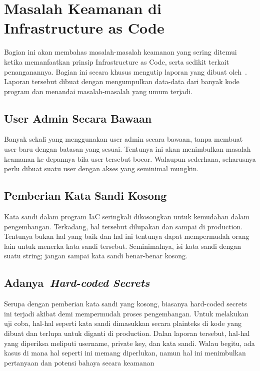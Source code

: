 \section{Masalah Keamanan di Infrastructure as Code}


Bagian ini akan membahas masalah-masalah keamanan yang sering ditemui ketika memanfaatkan prinsip Infrastructure as Code, serta sedikit terkait penanganannya. Bagian ini secara khusus mengutip laporan yang dibuat oleh~\cite{8812041}. Laporan tersebut dibuat dengan mengumpulkan data-data dari banyak kode program dan menandai masalah-masalah yang umum terjadi.

\subsection{User Admin Secara Bawaan}
Banyak sekali yang menggunakan user admin secara bawaan, tanpa membuat user baru dengan batasan yang sesuai. Tentunya ini akan menimbulkan masalah keamanan ke depannya bila user tersebut bocor. Walaupun sederhana, seharusnya perlu dibuat suatu user dengan akses yang seminimal mungkin.

\subsection{Pemberian Kata Sandi Kosong}
Kata sandi dalam program IaC seringkali dikosongkan untuk kemudahan dalam pengembangan. Terkadang, hal tersebut dilupakan dan sampai di production. Tentunya bukan hal yang baik dan hal ini tentunya dapat mempermudah orang lain untuk menerka kata sandi tersebut. Seminimalnya, isi kata sandi dengan suatu string; jangan sampai kata sandi benar-benar kosong.

\subsection{Adanya~\textit{Hard-coded Secrets}}
Serupa dengan pemberian kata sandi yang kosong, biasanya hard-coded secrets ini terjadi akibat demi mempermudah proses pengembangan. Untuk melakukan uji coba, hal-hal seperti kata sandi dimasukkan secara plainteks di kode yang dibuat dan terlupa untuk diganti di production. Dalan laporan tersebut, hal-hal yang diperiksa meliputi username, private key, dan kata sandi. Walau begitu, ada kasus di mana hal seperti ini memang diperlukan, namun hal ini menimbulkan pertanyaan dan potensi bahaya secara keamanan

